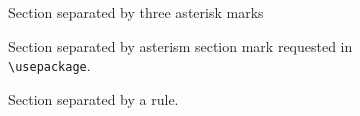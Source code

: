 \documentclass[12pt]{article}
\begin{document}
Section separated by three asterisk marks
\sectionbreak[!!!]

Section separated by asterism section mark requested in\\ \texttt{\textbackslash usepackage}.
\sectionbreak

Section separated by a rule.
\sectionbreakmark{\rule{10em}{3pt}}
\sectionbreak
\end{document}
